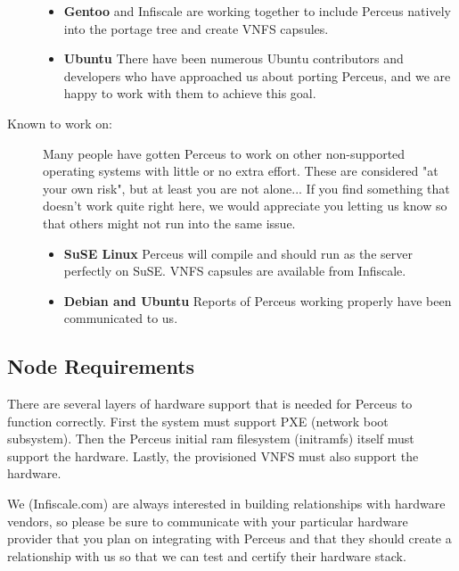 \documentclass[10pt,letterpaper]{report}
\begin{document}
\begin{description}
\begin{itemize}
\item {\bf Gentoo} and Infiscale are working together to include Perceus
natively into the portage tree and create VNFS capsules.

\item {\bf Ubuntu} There have been numerous Ubuntu contributors and developers
who have approached us about porting Perceus, and we are happy to work with
them to achieve this goal.

\end{itemize}

\item[Known to work on:] Many people have gotten Perceus to work on other
non-supported operating systems with little or no extra effort. These are
considered "at your own risk", but at least you are not alone... If you find
something that doesn't work quite right here, we would appreciate you letting
us know so that others might not run into the same issue.

\begin{itemize}

\item {\bf SuSE Linux} Perceus will compile and should run as the server
perfectly on SuSE.  VNFS capsules are available from Infiscale.

\item {\bf Debian and Ubuntu} Reports of Perceus working properly have been
communicated to us.

\end{itemize}

\end{description}


\subsection{Node Requirements}

There are several layers of hardware support that is needed for Perceus to
function correctly. First the system must support PXE (network boot
subsystem). Then the Perceus initial ram filesystem (initramfs) itself must
support the hardware. Lastly, the provisioned VNFS must also support the
hardware.

We (Infiscale.com) are always interested in building relationships with
hardware vendors, so please be sure to communicate with your particular
hardware provider that you plan on integrating with Perceus and that they
should create a relationship with us so that we can test and certify their
hardware stack.
\end{document}
